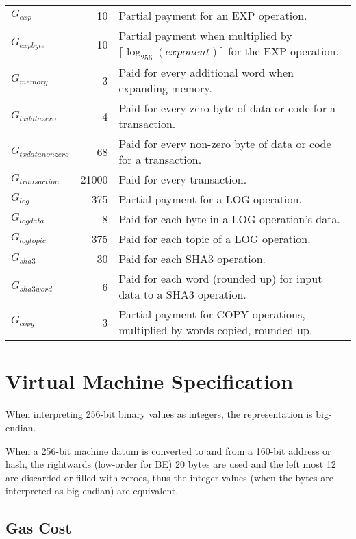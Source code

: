 \documentclass[9pt,oneside]{amsart}
\begin{document}
\begin{tabular*}{\columnwidth}[h]{lrl}
$G_{exp}$ & 10 & Partial payment for an {\small EXP} operation. \\
$G_{expbyte}$ & 10 & Partial payment when multiplied by $\lceil\log_{256}(exponent)\rceil$ for the {\small EXP} operation. \\
$G_{memory}$ & 3 & Paid for every additional word when expanding memory. \\
$G_{txdatazero}$ & 4 & Paid for every zero byte of data or code for a transaction. \\
$G_{txdatanonzero}$ & 68 & Paid for every non-zero byte of data or code for a transaction. \\
$G_{transaction}$ & 21000 & Paid for every transaction. \\
$G_{log}$ & 375 & Partial payment for a {\small LOG} operation. \\
$G_{logdata}$ & 8 & Paid for each byte in a {\small LOG} operation's data. \\
$G_{logtopic}$ & 375 & Paid for each topic of a {\small LOG} operation. \\
$G_{sha3}$ & 30 & Paid for each {\small SHA3} operation. \\
$G_{sha3word}$ & 6 & Paid for each word (rounded up) for input data to a {\small SHA3} operation. \\
$G_{copy}$ & 3 & Partial payment for {\small *COPY} operations, multiplied by words copied, rounded up. \\

\bottomrule
\end{tabular*}

\section{Virtual Machine Specification}\label{app:vm}

When interpreting 256-bit binary values as integers, the representation is big-endian.

When a 256-bit machine datum is converted to and from a 160-bit address or hash, the rightwards (low-order for BE) 20 bytes are used and the left most 12 are discarded or filled with zeroes, thus the integer values (when the bytes are interpreted as big-endian) are equivalent.

\subsection{Gas Cost}
\end{document}
